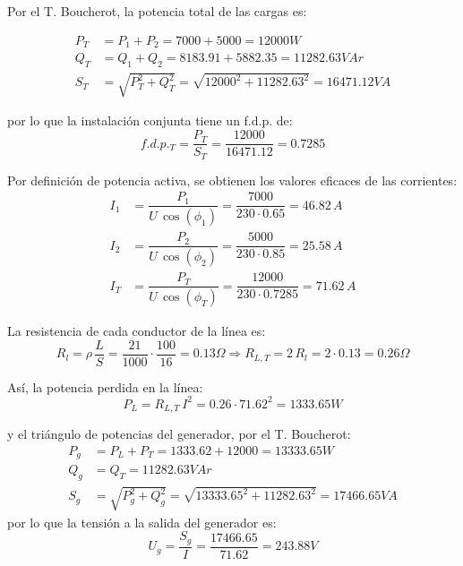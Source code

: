 Por el T. Boucherot, la potencia total de las cargas es:

\begin{align*}
  P_T&=P_1+P_2=7000+5000=12000W\\
  Q_T&=Q_1+Q_2=8183.91+5882.35=11282.63VAr\\
  S_T&=\sqrt{P_T^2+Q_T^2}=\sqrt{12000^2+11282.63^2}=16471.12VA
\end{align*}

por lo que la instalación conjunta tiene un f.d.p. de:
\begin{equation*}
  f.d.p._T=\dfrac{P_T}{S_T}=\dfrac{12000}{16471.12}=0.7285
\end{equation*}

Por definición de potencia activa, se obtienen los valores eficaces de
las corrientes:
\begin{align*}
  I_1&=\dfrac{P_1}{U\,\cos(\phi_1)}=\dfrac{7000}{230\cdot
       0.65}=46.82\,A\\
  I_2&=\dfrac{P_2}{U\,\cos(\phi_2)}=\dfrac{5000}{230\cdot
       0.85}=25.58\,A\\
  I_T&=\dfrac{P_T}{U\,\cos(\phi_T)}=\dfrac{12000}{230\cdot
       0.7285}=71.62\,A
\end{align*}

La resistencia de cada conductor de la línea es:
\begin{equation*}
  R_l=\rho\,\dfrac{L}{S}=\dfrac{21}{1000}\cdot
  \dfrac{100}{16}=0.13\Omega \Rightarrow R_{L,T}=2\,R_l=2\cdot
  0.13=0.26\Omega
\end{equation*}

Así, la potencia perdida en la línea:
\begin{equation*}
  P_L=R_{L,T}\,I^2=0.26\cdot 71.62^2=1333.65W
\end{equation*}

y el triángulo de potencias del generador, por el T. Boucherot:
\begin{align*}
  P_g&=P_L+P_T=1333.62+12000=13333.65 W\\ Q_g&=Q_T=11282.63 VAr\\
  S_g&=\sqrt{P_g^2+Q_g^2}=\sqrt{13333.65^2+11282.63^2}=17466.65 VA
\end{align*} por lo que
la tensión a la salida del generador es:
\begin{equation*}
  U_g=\dfrac{S_g}{I}=\dfrac{17466.65}{71.62}=243.88 V
\end{equation*}

